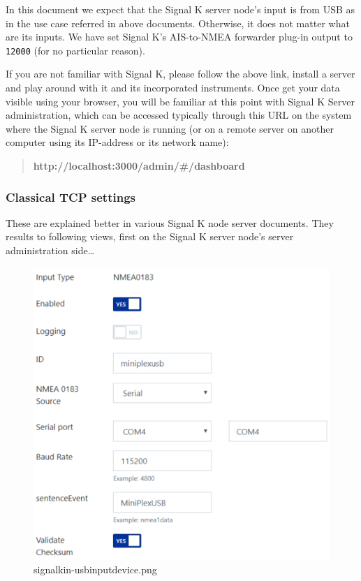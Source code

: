 \documentclass[11pt]{article}
\begin{document}
    In this document we expect that the Signal K server node's input is from
USB as in the use case referred in above documents. Otherwise, it does
not matter what are its inputs. We have set Signal K's AIS-to-NMEA
forwarder plug-in output to \texttt{12000} (for no particular reason).

    If you are not familiar with Signal K, please follow the above link,
install a server and play around with it and its incorporated
instruments. Once get your data visible using your browser, you will be
familiar at this point with Signal K Server administration, which can be
accessed typically through this URL on the system where the Signal K
server node is running (or on a remote server on another computer using
its IP-address or its network name):

    \begin{quote}
\textbf{http://localhost:3000/admin/\#/dashboard}
\end{quote}

    \hypertarget{classical-tcp-settings}{%
\subsubsection{Classical TCP settings}\label{classical-tcp-settings}}

    These are explained better in various Signal K node server documents.
They results to following views, first on the Signal K server node's
server administration side\ldots{}

    \begin{figure}
\centering
\includegraphics{signalkin-usbinputdevice.png}
\caption{signalkin-usbinputdevice.png}
\end{figure}
\end{document}
